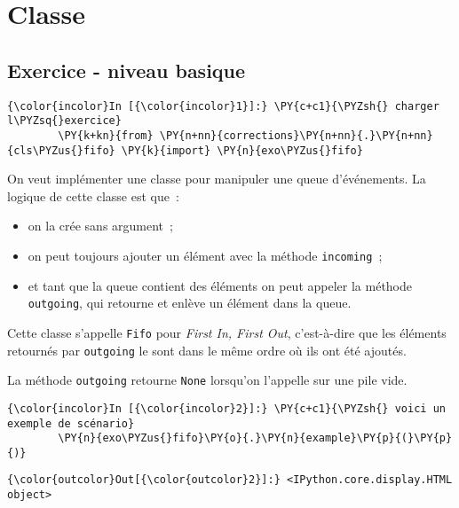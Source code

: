     
    
    
    

    

    \hypertarget{classe}{%
\section{Classe}\label{classe}}

    \hypertarget{exercice---niveau-basique}{%
\subsection{Exercice - niveau basique}\label{exercice---niveau-basique}}

    \begin{Verbatim}[commandchars=\\\{\}]
{\color{incolor}In [{\color{incolor}1}]:} \PY{c+c1}{\PYZsh{} charger l\PYZsq{}exercice}
        \PY{k+kn}{from} \PY{n+nn}{corrections}\PY{n+nn}{.}\PY{n+nn}{cls\PYZus{}fifo} \PY{k}{import} \PY{n}{exo\PYZus{}fifo}
\end{Verbatim}


    On veut implémenter une classe pour manipuler une queue d'événements. La
logique de cette classe est que~:

\begin{itemize}
\tightlist
\item
  on la crée sans argument~;
\item
  on peut toujours ajouter un élément avec la méthode
  \texttt{incoming}~;
\item
  et tant que la queue contient des éléments on peut appeler la méthode
  \texttt{outgoing}, qui retourne et enlève un élément dans la queue.
\end{itemize}

Cette classe s'appelle \texttt{Fifo} pour \emph{First In, First Out},
c'est-à-dire que les éléments retournés par \texttt{outgoing} le sont
dans le même ordre où ils ont été ajoutés.

La méthode \texttt{outgoing} retourne \texttt{None} lorsqu'on l'appelle
sur une pile vide.

    \begin{Verbatim}[commandchars=\\\{\}]
{\color{incolor}In [{\color{incolor}2}]:} \PY{c+c1}{\PYZsh{} voici un exemple de scénario}
        \PY{n}{exo\PYZus{}fifo}\PY{o}{.}\PY{n}{example}\PY{p}{(}\PY{p}{)}
\end{Verbatim}


\begin{Verbatim}[commandchars=\\\{\}]
{\color{outcolor}Out[{\color{outcolor}2}]:} <IPython.core.display.HTML object>
\end{Verbatim}
            
